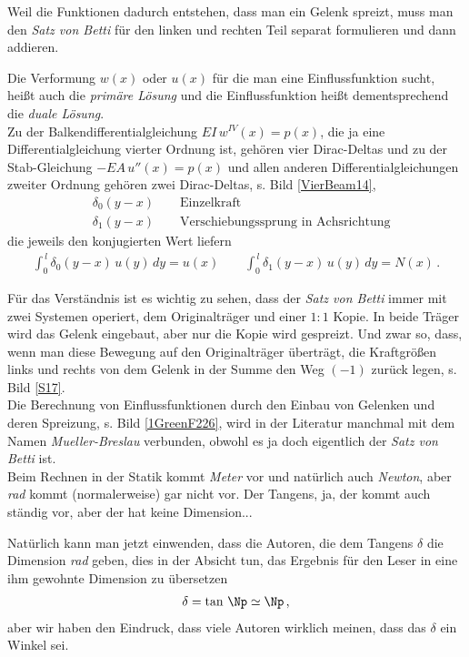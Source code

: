 Weil die Funktionen dadurch entstehen, dass man ein Gelenk spreizt, muss man den {\em Satz von Betti\/} f\"{u}r den linken und rechten Teil
separat formulieren und dann addieren.

Die Verformung $w(x)$ oder $u(x)$ f\"{u}r die man eine Einflussfunktion sucht, hei{\ss}t auch die {\em prim\"{a}re L\"{o}sung\/} und die Einflussfunktion hei{\ss}t dementsprechend die {\em duale L\"{o}sung\/}.
\\

Zu der Balkendifferentialgleichung $EI\,w^{IV}(x) = p(x) $, die ja eine Differentialgleichung vierter Ordnung ist, geh\"{o}ren vier Dirac-Deltas und zu der Stab-Gleichung $- EA\,u''(x) = p(x)$ und allen anderen Differentialgleichungen zweiter Ordnung geh\"{o}ren zwei Dirac-Deltas, s. Bild \ref{VierBeam14},
\begin{align}
&\delta_0(y-x) \qquad \text{Einzelkraft}\\
&\delta_1(y-x) \qquad \text{Verschiebungssprung in Achsrichtung}
\end{align}
die jeweils den konjugierten Wert liefern
\begin{align}
\int_0^{\,l} \delta_0(y-x)\,u(y)\,dy = u(x) \qquad \int_0^{\,l} \delta_1(y-x)\,u(y)\,dy = N(x)\,.
\end{align}


F\"{u}r das Verst\"{a}ndnis ist es wichtig zu sehen, dass der {\em Satz von Betti\/} immer mit zwei Systemen operiert, dem Originaltr\"{a}ger und einer $1:1$ Kopie. In beide Tr\"{a}ger wird das Gelenk eingebaut, aber
nur die Kopie wird gespreizt. Und zwar so, dass, wenn man diese Bewegung auf den Originaltr\"{a}ger \"{u}bertr\"{a}gt, die Kraftgr\"{o}{\ss}en links und rechts von dem Gelenk in der Summe den Weg $(-1)$ zur\"{u}ck legen, s. Bild \ref{S17}.\\

Die Berechnung von Einflussfunktionen durch den Einbau von Gelenken und deren Spreizung, s. Bild \ref{1GreenF226}, wird in der Literatur manchmal mit dem Namen {\em Mueller-Breslau\/} verbunden, obwohl es ja doch eigentlich der {\em Satz von Betti\/} ist.\\



Beim Rechnen in der Statik kommt {\em Meter\/} vor und nat\"{u}rlich auch {\em Newton\/}, aber {\em rad\/} kommt (normalerweise) gar nicht vor. Der Tangens, ja, der kommt auch st\"{a}ndig vor, aber der hat keine Dimension...

Nat\"{u}rlich kann man jetzt einwenden, dass die Autoren, die dem Tangens $\delta$ die Dimension {\em rad\/} geben, dies in der Absicht tun, das Ergebnis f\"{u}r den Leser in eine ihm gewohnte Dimension zu \"{u}bersetzen
\begin{align}
\delta = \tan\,\Np \simeq \Np\,,
\end{align}
aber wir haben den Eindruck, dass viele Autoren wirklich meinen, dass das $\delta$ ein Winkel sei.\\

